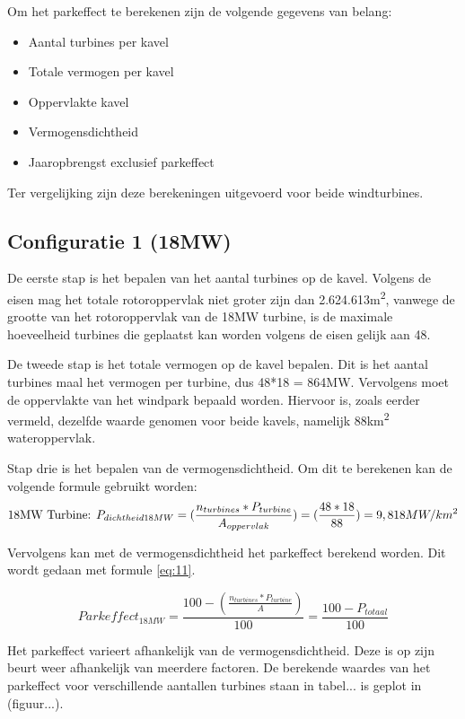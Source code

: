 Om het parkeffect te berekenen zijn de volgende gegevens van belang: 
\begin{itemize}
    \item Aantal turbines per kavel
    \item Totale vermogen per kavel
    \item Oppervlakte kavel
    \item Vermogensdichtheid 
    \item Jaaropbrengst exclusief parkeffect
\end{itemize}

Ter vergelijking zijn deze berekeningen uitgevoerd voor beide windturbines. 

\subsection{Configuratie 1 (18MW)}
De eerste stap is het bepalen van het aantal turbines op de kavel. Volgens de eisen mag het totale rotoroppervlak niet groter zijn dan 2.624.613m\textsuperscript{2}, vanwege de grootte van het rotoroppervlak van de 18MW turbine, is de maximale hoeveelheid turbines die geplaatst kan worden volgens de eisen gelijk aan 48. 

De tweede stap is het totale vermogen op de kavel bepalen. Dit is het aantal turbines maal het vermogen per turbine, dus 48*18 = 864MW. Vervolgens moet de oppervlakte van het windpark bepaald worden. Hiervoor is, zoals eerder vermeld, dezelfde waarde genomen voor beide kavels, namelijk 88km\textsuperscript{2} wateroppervlak. 

Stap drie is het bepalen van de vermogensdichtheid. Om dit te berekenen kan de volgende formule gebruikt worden: 
\begin{equation} \label{eq:10}
\text{18MW Turbine: } P_{dichtheid18MW}=(\frac{n_{turbines}*P_{turbine}}{A_{oppervlak}}) = (\frac{48*18}{88}) = 9,818 MW/km\textsuperscript{2}
\end{equation}

Vervolgens kan met de vermogensdichtheid het parkeffect berekend worden. Dit wordt gedaan met formule \ref{eq:11}. 

\begin{equation} \label{eq:11}
 Parkeffect_{18MW}=\frac{100-(\frac{n_{turbines}*P_{turbine}}{A})}{100} = \frac{100-P_{totaal}}{100}
\end{equation}

Het parkeffect varieert afhankelijk van de vermogensdichtheid. Deze is op zijn beurt weer afhankelijk van meerdere factoren. De berekende waardes van het parkeffect voor verschillende aantallen turbines staan in tabel... is geplot in (figuur...). 

